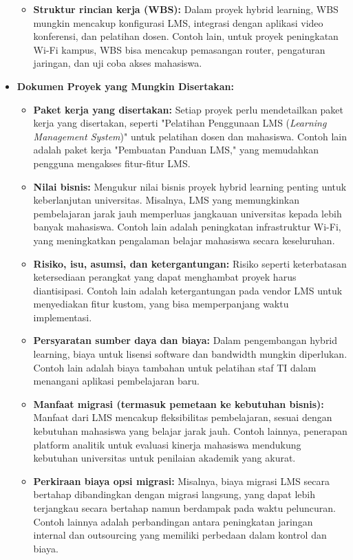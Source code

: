 \begin{itemize}
\begin{itemize}
		\item \textbf{Struktur rincian kerja (WBS):} Dalam proyek hybrid learning, WBS mungkin mencakup konfigurasi LMS, integrasi dengan aplikasi video konferensi, dan pelatihan dosen. Contoh lain, untuk proyek peningkatan Wi-Fi kampus, WBS bisa mencakup pemasangan router, pengaturan jaringan, dan uji coba akses mahasiswa.
	\end{itemize}
	
	\item \textbf{Dokumen Proyek yang Mungkin Disertakan:}
	
	\begin{itemize}
		\item \textbf{Paket kerja yang disertakan:} Setiap proyek perlu mendetailkan paket kerja yang disertakan, seperti "Pelatihan Penggunaan LMS (\textit{Learning Management System})" untuk pelatihan dosen dan mahasiswa. Contoh lain adalah paket kerja "Pembuatan Panduan LMS," yang memudahkan pengguna mengakses fitur-fitur LMS.
		
		\item \textbf{Nilai bisnis:} Mengukur nilai bisnis proyek hybrid learning penting untuk keberlanjutan universitas. Misalnya, LMS yang memungkinkan pembelajaran jarak jauh memperluas jangkauan universitas kepada lebih banyak mahasiswa. Contoh lain adalah peningkatan infrastruktur Wi-Fi, yang meningkatkan pengalaman belajar mahasiswa secara keseluruhan.
		
		\item \textbf{Risiko, isu, asumsi, dan ketergantungan:} Risiko seperti keterbatasan ketersediaan perangkat yang dapat menghambat proyek harus diantisipasi. Contoh lain adalah ketergantungan pada vendor LMS untuk menyediakan fitur kustom, yang bisa memperpanjang waktu implementasi.
		
		\item \textbf{Persyaratan sumber daya dan biaya:} Dalam pengembangan hybrid learning, biaya untuk lisensi software dan bandwidth mungkin diperlukan. Contoh lain adalah biaya tambahan untuk pelatihan staf TI dalam menangani aplikasi pembelajaran baru.
		
		\item \textbf{Manfaat migrasi (termasuk pemetaan ke kebutuhan bisnis):} Manfaat dari LMS mencakup fleksibilitas pembelajaran, sesuai dengan kebutuhan mahasiswa yang belajar jarak jauh. Contoh lainnya, penerapan platform analitik untuk evaluasi kinerja mahasiswa mendukung kebutuhan universitas untuk penilaian akademik yang akurat.
		
		\item \textbf{Perkiraan biaya opsi migrasi:} Misalnya, biaya migrasi LMS secara bertahap dibandingkan dengan migrasi langsung, yang dapat lebih terjangkau secara bertahap namun berdampak pada waktu peluncuran. Contoh lainnya adalah perbandingan antara peningkatan jaringan internal dan outsourcing yang memiliki perbedaan dalam kontrol dan biaya.
	\end{itemize}
\end{itemize}

